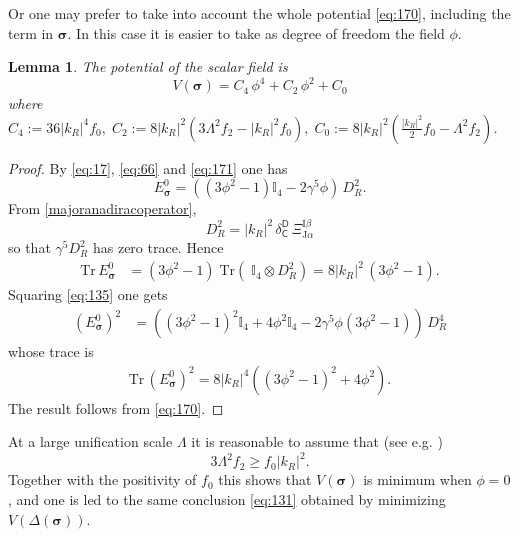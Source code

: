 \documentclass[11pt]{article}
\newcommand{\sig}{{\boldsymbol{\sigma}}}
\newcommand{\sI}{\mathrm  I}
\newcommand{\sJ}{\mathrm J}
\newcommand{\sC}{\mathsf C}
\newcommand{\sD}{\mathsf D}
\newtheorem{lemma}[prop]{Lemma}
\begin{document}
Or one may prefer to take into account the whole potential
\eqref{eq:170}, including the term in $\sig$. In this case it is easier to take as degree of freedom the field
$\phi$.
\begin{lemma}
\label{propscal}
The potential of the scalar field is
  \begin{equation}
  \label{eq:18}
  V(\sig) = C_4 \,\phi^4   + C_2\,\phi^2 + C_0
  \end{equation}
where
$C_4:= 36 |k_R|^4 f_0 ,\; C_2:=8 |k_R|^2 (3\Lambda^2 f_2  - |k_R|^2
  f_0 ),\; C_0:= 8 |k_R|^2 \left( \frac{|k_R|^2}{2}f_0  - \Lambda^2 f_2\right)$.
\end{lemma}
\begin{proof}
By \eqref{eq:17}, \eqref{eq:66} and  \eqref{eq:171}  one has
\begin{equation}
\label{eq:135}
  E_\sig^0 = \left((3\phi^2 - 1){\mathbb I}_4 -  2\gamma^5\phi\right)\, D_R^2.
\end{equation}  From \eqref{majoranadiracoperator},
\begin{equation}
  \label{eq:83}
  D_R^2 = |k_R|^2 \, \delta_{\sC}^{\sD}\, \Xi_{\sJ\alpha}^{\sI\beta}
\end{equation}
so that $\gamma^5D_R^2$ has zero trace. Hence
\begin{align}
  \text{Tr} \, E_{\sig}^0 &= (3\phi^2 - 1) \;\text{Tr}\left( \;
    {\mathbb I}_4 \otimes D_R^2\right) = 8|k_R|^2\,(3\phi^2 -1). 
\end{align}
Squaring \eqref{eq:135} one gets
\begin{align}
  \label{eq:55}
  (E_{\sig}^0)^2 &= \left((3\phi^2 - 1)^2{\mathbb I}_4 +  4\phi^2 {\mathbb I}_4 - 2\gamma^5\phi(3\phi^2-1)\right)\, D_R^4
\end{align}
whose trace is
\begin{align}
  \label{eq:57}
  \text{Tr}\,   (E^0_{\sig})^2 = 8|k_R|^4\left((3\phi^2 - 1)^2+  4\phi^2 \right).
\end{align}
The result follows from \eqref{eq:170}.
\end{proof}
\noindent At a large unification scale $\Lambda$ it is reasonable to assume
that (see e.g. \cite[\S 11.3.2]{Walterlivre})
\begin{equation}
3\Lambda^2 f_2 \geq f_0|k_R|^2.
\label{eq:168}
\end{equation}
 Together with the positivity
of $f_0$ this shows that 
  $V(\sig)$ is minimum when $\phi=0$, and one is led to the same
  conclusion \eqref{eq:131} obtained by minimizing $V(\Delta(\sig))$.
\end{document}
